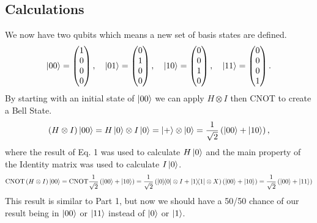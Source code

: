 \documentclass{exam}
\begin{document}
    \subsection{Calculations}
    We now have two qubits which means a new set of basis states are defined.
    \begin{equation*}
        \ket{00} = \begin{pmatrix} 1\\0\\0\\0 \end{pmatrix}, \quad
        \ket{01} = \begin{pmatrix} 0\\1\\0\\0 \end{pmatrix}, \quad
        \ket{10} = \begin{pmatrix} 0\\0\\1\\0 \end{pmatrix}, \quad
        \ket{11} = \begin{pmatrix} 0\\0\\0\\1 \end{pmatrix}. 
    \end{equation*}
    By starting with an initial state of $\ket{00}$ we can apply $H \otimes I$ then CNOT to create a Bell State.
    \begin{equation}
        \left(H \otimes I\right)\ket{00} = 
        H\ket{0} \otimes I\ket{0} = 
        \ket{+} \otimes \ket{0} = 
        \frac{1}{\sqrt{2}}\left(\ket{00} + \ket{10}\right),
    \end{equation}
    where the result of Eq. 1 was used to calculate $H\ket{0}$ and the main property of the Identity matrix was used to calculate $I\ket{0}$.
    \begin{equation}
        \text{CNOT}\left(H \otimes I\right)\ket{00} = 
        \text{CNOT}\frac{1}{\sqrt{2}}\left(\ket{00} + \ket{10}\right) =
        \frac{1}{\sqrt{2}}\left(\ket{0}\!\!\bra{0} \otimes I + \ket{1}\!\!\bra{1} \otimes X\right)\left(\ket{00} + \ket{10}\right) = \frac{1}{\sqrt{2}}\left(\ket{00} + \ket{11}\right)
    \end{equation} 
    This result is similar to Part 1, but now we should have a 50/50 chance of our result being in $\ket{00}$ or $\ket{11}$ instead of $\ket{0}$ or $\ket{1}$.
\end{document}
